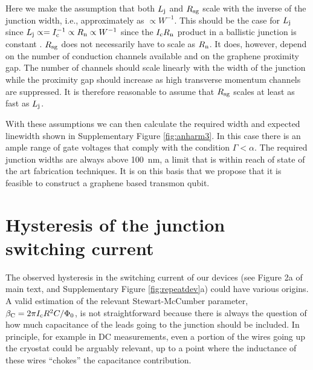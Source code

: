 \documentclass[preprint,
  onecolumn,
  notitlepage,
  amsmath,amssymb,
  aip,
  apl,
]{revtex4-1}
\begin{document}
Here we make the assumption that both $L_{\rm j}$ and $R_{\rm sg}$ scale with the inverse of the junction width, i.e., approximately as $\propto W^{-1}$.
This should be the case for $L_{\rm j}$ since $L_{\rm j} \propto = I_{\rm c}^{-1} \propto R_{\rm n} \propto W^{-1}$ since the $I_{\rm c}R_{\rm n}$ product in a ballistic junction is constant \cite{titov_josephson_2006}.
$R_{\rm sg}$ does not necessarily have to scale as $R_{\rm n}$.
It does, however, depend on the number of conduction channels available and on the graphene proximity gap.
The number of channels should scale linearly with the width of the junction while the proximity gap should increase as high transverse momentum channels are suppressed.
It is therefore reasonable to assume that $R_{\rm sg}$ scales at least as fast as $L_{\rm j}$.

With these assumptions we can then calculate the required width and expected linewidth shown in Supplementary Figure \ref{fig:anharm3}.
In this case there is an ample range of gate voltages that comply with the condition $\Gamma<\alpha$.
The required junction widths are always above \SI{100}{nm}, a limit that is within reach of state of the art fabrication techniques.
It is on this basis that we propose that it is feasible to construct a graphene based transmon qubit.

    


\section{Hysteresis of the junction switching current}\label{sec:hysteresis}
\noindent The observed hysteresis in the switching current of our devices (see Figure 2a of main text, and Supplementary Figure \ref{fig:repeatdev}a) could have various origins.
A valid estimation of the relevant Stewart-McCumber parameter\cite{tinkham_introduction_1996}, $\beta_{\rm C}=2\pi I_{\rm c}R^2C/\Phi_0$, is not straightforward because there is always the question of how much capacitance of the leads going to the junction should be included.
In principle, for example in DC measurements, even a portion of the wires going up the cryostat could be arguably relevant, up to a point where the inductance of these wires ``chokes'' the capacitance contribution.
\end{document}
